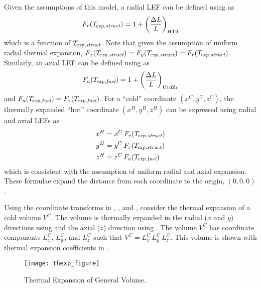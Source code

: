     Given the assumptions of this model, a radial LEF can be defined using 
     as
    \begin{equation}
      \label{eq:lef_r}
      F_r(T_{\!\mbox{\scriptsize \em exp,struct}}) = 1 + \left(\frac{\Delta L}{L}\right)_{\text{HT9}}
    \end{equation}
    which is a function of $T_{\!\mbox{\scriptsize \em exp,struct}}$. Note that given the assumption of 
    uniform radial thermal expansion, ${F_x(T_{\!\mbox{\scriptsize \em exp,struct}}) = F_y(T_{\!\mbox{\scriptsize \em exp,struct}}) =
    F_r(T_{\!\mbox{\scriptsize \em exp,struct}})}$.
    Similarly, an axial LEF can be defined using  as 
    \begin{equation}
      \label{eq:lef_a}
      F_a({T_{\!\mbox{\scriptsize \em exp,fuel}}}) = 1 + \left(\frac{\Delta L}{L}\right)_{\text{U10Zr}}
    \end{equation}
    and $F_a({T_{\!\mbox{\scriptsize \em exp,fuel}}}) = F_z({T_{\!\mbox{\scriptsize \em exp,fuel}}})$. For a ``cold'' coordinate 
    $(x^C,y^C,z^C)$, the thermally expanded ``hot'' coordinate $(x^H,y^H,z^H)$ 
    can be expressed using radial and axial LEFs as
    \begin{align}
      \label{eq:expand_x}
      x^H &= x^C \, F_r(T_{\!\mbox{\scriptsize \em exp,struct}}) \\
      \label{eq:expand_y}
      y^H &= y^C \, F_r(T_{\!\mbox{\scriptsize \em exp,struct}}) \\
      \label{eq:expand_z}
      z^H &= z^C \, F_a({T_{\!\mbox{\scriptsize \em exp,fuel}}})
    \end{align}
    which is consistent with the assumption of uniform radial and axial 
    expansion. These formulae expand the distance from each coordinate to the
    origin, $(0,0,0)$.

    Using the coordinate transforms in , , 
    and , consider the thermal expansion of a cold volume 
    $V^C$. The volume is thermally expanded in the radial ($x$ and $y$) 
    directions using  and the axial ($z$) direction using 
    . The volume $V^C$ has coordinate components $L_x^C$, 
    $L_y^C$, and $L_z^C$ such that ${V^C = L_x^C \, L_y^C \, L_z^C}$. This 
    volume is shown with thermal expansion coefficients in 
    .

    \begin{figure}
      \centering
      \texttt{[image: thexp\_figure]}
      \caption{Thermal Expansion of General Volume.}
      \label{fig:thexp_figure}
    \end{figure}
    
